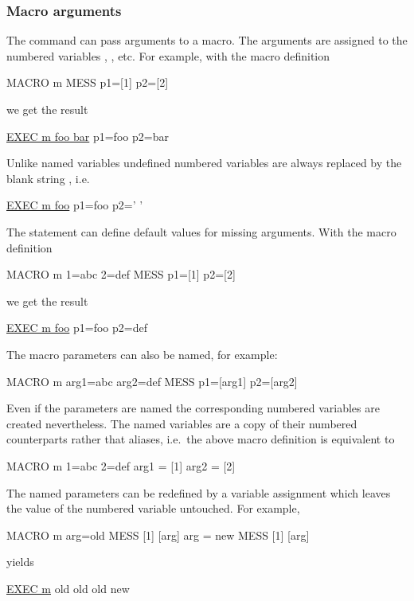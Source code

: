 \subsubsection{Macro arguments}

The  command can pass arguments to a macro.
The arguments are assigned to the numbered variables \Lit{[1]},
\Lit{[2]}, etc.
For example, with the macro definition
\begin{XMP}
MACRO m
MESS p1=[1] p2=[2]
\end{XMP}
we get the result
\begin{XMP}
\PROMPT{} \underline{EXEC m foo bar}
 p1=foo p2=bar
\end{XMP}
Unlike named variables undefined numbered variables are always
replaced by the blank string , i.e.\
\begin{XMP}
\PROMPT{} \underline{EXEC m foo}
 p1=foo p2=' '
\end{XMP}
\vspace{-.5\baselineskip}

The \Cind{MACRO} statement can define default values for missing
arguments.
With the macro definition
\begin{XMP}
MACRO m 1=abc 2=def
MESS p1=[1] p2=[2]
\end{XMP}
we get the result
\begin{XMP}
\PROMPT{} \underline{EXEC m foo}
 p1=foo p2=def
\end{XMP}
\vspace{-.5\baselineskip}

The macro parameters can also be named, for example:
\begin{XMP}
MACRO m arg1=abc arg2=def
MESS p1=[arg1] p2=[arg2]
\end{XMP}
Even if the parameters are named the corresponding numbered variables
are created nevertheless.
The named variables are a copy of their numbered counterparts rather
that aliases, i.e.\ the above macro definition is equivalent to
\begin{XMP}
MACRO m 1=abc 2=def
arg1 = [1]
arg2 = [2]
\end{XMP}
The named parameters can be redefined by a variable assignment which
leaves the value of the numbered variable untouched.
For example,
\begin{XMP}
MACRO m arg=old
MESS [1] [arg]
arg = new
MESS [1] [arg]
\end{XMP}
yields
\begin{XMP}
\PROMPT{} \underline{EXEC m}
 old old
 old new
\end{XMP}
\vspace{-.5\baselineskip}

